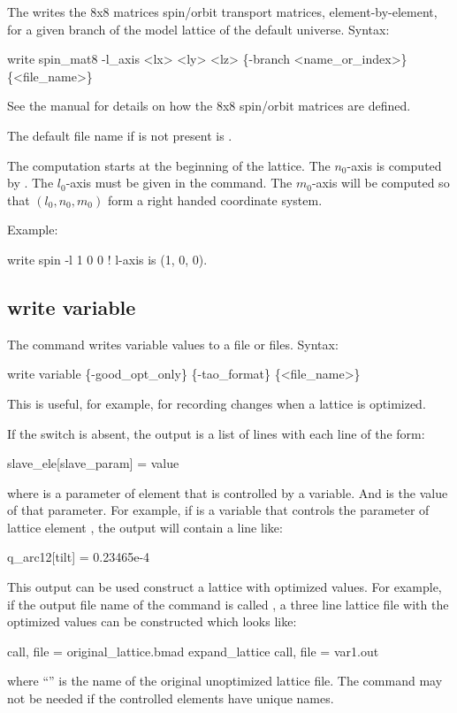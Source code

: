 {{{{{{{{{{{The  writes the 8x8 matrices spin/orbit transport matrices, element-by-element, for
a given branch of the model lattice of the default universe.
Syntax:
\begin{example}
  write spin_mat8 -l_axis <lx> <ly> <lz> \{-branch <name_or_index>\} \{<file_name>\}
\end{example}
See the \bmad manual for details on how the 8x8 spin/orbit matrices are defined. 

The default file name if  is not present is .

The computation starts at the beginning of the lattice. The $n_0$-axis is computed by \bmad. The
$l_0$-axis must be given in the  command.  The $m_0$-axis will be computed so
that $(l_0, n_0, m_0)$ form a right handed coordinate system.

Example:
\begin{example}
  write spin -l 1 0 0    ! l-axis is (1, 0, 0).
\end{example}


\subsection{write variable}
\label{s:write.variable}

The  command writes \tao variable values to a file or files.
Syntax:
\begin{example}
  write variable \{-good_opt_only\} \{-tao_format\} \{<file_name>\} 
\end{example}
This is useful, for example, for recording changes when a lattice is optimized.

If the  switch is absent, the output is a list of lines with each line of the form:
\begin{example}
  slave_ele[slave_param] = value
\end{example}
where  is a parameter of \bmad element  that is controlled by a \tao
variable. And  is the value of that parameter. For example, if  is a \tao
variable that controls the  parameter of \bmad lattice element , the output
will contain a line like:
\begin{example}
  q_arc12[tilt] = 0.23465e-4
\end{example}
This output can be used construct a lattice with optimized values. For example, if the output file
name of the  command is called , a three line lattice file with the
optimized values can be constructed which looks like:
\begin{example}
  call, file = original_lattice.bmad
  expand_lattice
  call, file = var1.out
\end{example}
where ``'' is the name of the original unoptimized lattice file. The
 command may not be needed if the controlled \bmad elements have unique names.

}}}}}}}}}}}

